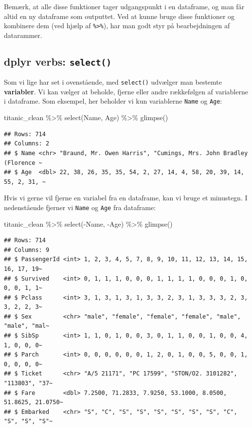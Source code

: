 \documentclass[
]{book}
\newenvironment{Shaded}{\begin{snugshade}}{\end{snugshade}}
\newcommand{\FunctionTok}[1]{\textcolor[rgb]{0.00,0.00,0.00}{#1}}
\newcommand{\NormalTok}[1]{#1}
\newcommand{\SpecialCharTok}[1]{\textcolor[rgb]{0.00,0.00,0.00}{#1}}
\begin{document}
Bemærk, at alle disse funktioner tager udgangspunkt i en dataframe, og man får altid en ny dataframe som outputtet. Ved at kunne bruge disse funktioner og kombinere dem (ved hjælp af \texttt{\%\textgreater{}\%}), har man godt styr på bearbejdningen af datarammer.

\hypertarget{dplyr-verbs-select}{%
\subsection{\texorpdfstring{dplyr verbs: \texttt{select()}}{dplyr verbs: select()}}\label{dplyr-verbs-select}}

Som vi lige har set i ovenstående, med \texttt{select()} udvælger man bestemte \textbf{variabler}. Vi kan vælger at beholde, fjerne eller andre rækkefølgen af variablerne i dataframe. Som eksempel, her beholder vi kun variablerne \texttt{Name} og \texttt{Age}:

\begin{Shaded}
\begin{Highlighting}[]
\NormalTok{titanic\_clean }\SpecialCharTok{\%\textgreater{}\%} 
  \FunctionTok{select}\NormalTok{(Name, Age) }\SpecialCharTok{\%\textgreater{}\%}
  \FunctionTok{glimpse}\NormalTok{()}
\end{Highlighting}
\end{Shaded}

\begin{verbatim}
## Rows: 714
## Columns: 2
## $ Name <chr> "Braund, Mr. Owen Harris", "Cumings, Mrs. John Bradley (Florence ~
## $ Age  <dbl> 22, 38, 26, 35, 35, 54, 2, 27, 14, 4, 58, 20, 39, 14, 55, 2, 31, ~
\end{verbatim}

Hvis vi gerne vil fjerne en variabel fra en dataframe, kan vi bruge et minustegn. I nedenstående fjerner vi \texttt{Name} og \texttt{Age} fra dataframe:

\begin{Shaded}
\begin{Highlighting}[]
\NormalTok{titanic\_clean }\SpecialCharTok{\%\textgreater{}\%} 
  \FunctionTok{select}\NormalTok{(}\SpecialCharTok{{-}}\NormalTok{Name, }\SpecialCharTok{{-}}\NormalTok{Age) }\SpecialCharTok{\%\textgreater{}\%}
  \FunctionTok{glimpse}\NormalTok{()}
\end{Highlighting}
\end{Shaded}

\begin{verbatim}
## Rows: 714
## Columns: 9
## $ PassengerId <int> 1, 2, 3, 4, 5, 7, 8, 9, 10, 11, 12, 13, 14, 15, 16, 17, 19~
## $ Survived    <int> 0, 1, 1, 1, 0, 0, 0, 1, 1, 1, 1, 0, 0, 0, 1, 0, 0, 0, 1, 1~
## $ Pclass      <int> 3, 1, 3, 1, 3, 1, 3, 3, 2, 3, 1, 3, 3, 3, 2, 3, 3, 2, 2, 3~
## $ Sex         <chr> "male", "female", "female", "female", "male", "male", "mal~
## $ SibSp       <int> 1, 1, 0, 1, 0, 0, 3, 0, 1, 1, 0, 0, 1, 0, 0, 4, 1, 0, 0, 0~
## $ Parch       <int> 0, 0, 0, 0, 0, 0, 1, 2, 0, 1, 0, 0, 5, 0, 0, 1, 0, 0, 0, 0~
## $ Ticket      <chr> "A/5 21171", "PC 17599", "STON/O2. 3101282", "113803", "37~
## $ Fare        <dbl> 7.2500, 71.2833, 7.9250, 53.1000, 8.0500, 51.8625, 21.0750~
## $ Embarked    <chr> "S", "C", "S", "S", "S", "S", "S", "S", "C", "S", "S", "S"~
\end{verbatim}
\end{document}

